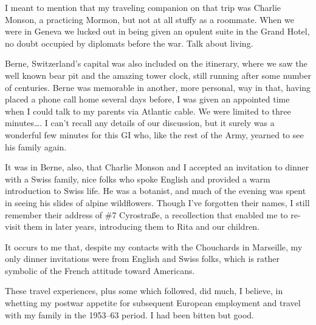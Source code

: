 \documentclass[../m3y]{subfiles}
\begin{document}
I meant to mention that my traveling companion on that trip was Charlie Monson, a practicing Mormon, but not at all stuffy as a roommate. When we were in Geneva we lucked out in being given an opulent suite in the Grand Hotel, no doubt occupied by diplomats before the war. Talk about living.

Berne, Switzerland's capital was also included on the itinerary, where we saw the well known bear pit and the amazing tower clock, still running after some number of centuries. Berne was memorable in another, more personal, way in that, having placed a phone call home several days before, I was given an appointed time when I could talk to my parents via Atlantic cable. We were limited to three minutes\ldots\@. I can't recall any details of our discussion, but it surely was a wonderful few minutes for this GI who, like the rest of the Army, yearned to see his family again.

It was in Berne, also, that Charlie Monson and I accepted an invitation to dinner with a Swiss family, nice folks who spoke English and provided a warm introduction to Swiss life. He was a botanist, and much of the evening was spent in seeing his slides of alpine wildflowers. Though I've forgotten their names, I still remember their address of \#7 Cyrostra{\ss}e, a recollection that enabled me to re-visit them in later years, introducing them to Rita and our children.

It occurs to me that, despite my contacts with the Chouchards in Marseille, my only dinner invitations were from English and Swiss folks, which is rather symbolic of the French attitude toward Americans.

These travel experiences, plus some which followed, did much, I believe, in whetting my postwar appetite for subsequent European employment and travel with my family in the
1953--63 period. I had been bitten but good.
\end{document}
